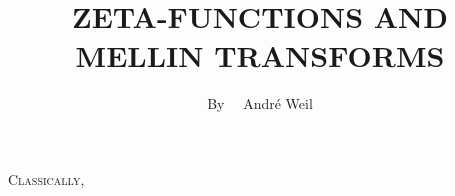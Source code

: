 \title{ZETA-FUNCTIONS AND MELLIN TRANSFORMS}

\author{By~~ Andr\'e Weil}
\date{}

\maketitle

\setcounter{pageoriginal}{408}
\textsc{Classically,}\pageoriginale
